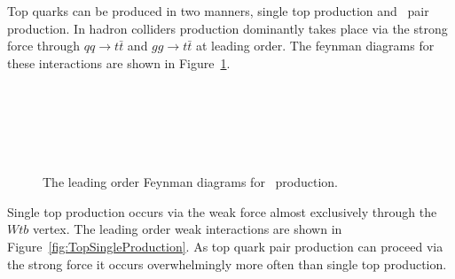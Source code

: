 Top quarks can be produced in two manners, single top production and \ttbar\ pair production. In hadron colliders production dominantly takes place via the strong force through $qq \rightarrow t\bar{t}$ and $gg \rightarrow t\bar{t}$ at leading order. The feynman diagrams for these interactions are shown in Figure~\ref{fig:TopQuarkProduction}. 

\begin{figure}[tbph]
  \centering
  \begin{minipage}[][][t]{.47\textwidth}
    \centering
    
  \end{minipage}
  \,
  \begin{minipage}[][][t]{.47\textwidth}
    \centering
    
  \end{minipage}
  
  \begin{minipage}[][][t]{.47\textwidth}
    \centering
    
  \end{minipage}
  \,
  \begin{minipage}[][][t]{.47\textwidth}
    \centering
    
  \end{minipage}
  \,
  \caption{The leading order Feynman diagrams for \ttbar\ production.}
  \label{fig:TopQuarkProduction}
\end{figure}

Single top production occurs via the weak force almost exclusively through the $Wtb$ vertex. The leading order weak interactions are shown in Figure~\ref{fig:TopSingleProduction}. As top quark pair production can proceed via the strong force it occurs overwhelmingly more often than single top production. 

